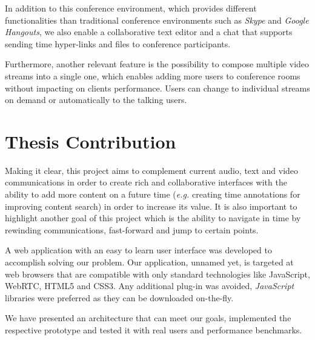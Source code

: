 	In addition to this conference environment, which provides different functionalities than traditional conference environments such as \emph{Skype} and \emph{Google Hangouts}, we also enable a collaborative text editor and a chat that supports sending time hyper-links and files to conference participants.

	Furthermore, another relevant feature is the possibility to compose multiple video streams into a single one, which enables adding more users to conference rooms without impacting on clients performance. Users can change to individual streams on demand or automatically to the talking users.
        

\section{Thesis Contribution}
\label{section:contribution}

Making it clear, this project aims to complement current audio, text and video communications in order to create rich and collaborative interfaces with the ability to add more content on a future time (\emph{e.g.} creating time annotations for improving content search) in order to increase its value. It is also important to highlight another goal of this project which is the ability to navigate in time by rewinding communications, fast-forward and jump to certain points.


A web application with an easy to learn user interface was developed to accomplish solving our problem. Our application, unnamed yet, is targeted at web browsers that are compatible with only standard technologies like JavaScript, \ac{WebRTC}, \ac{HTML}5 and \ac{CSS}3. Any additional plug-in was avoided, \emph{JavaScript} libraries were preferred as they can be downloaded on-the-fly.


	We have presented an architecture that can meet our goals, implemented the respective prototype and tested it with real users and performance benchmarks.

        
